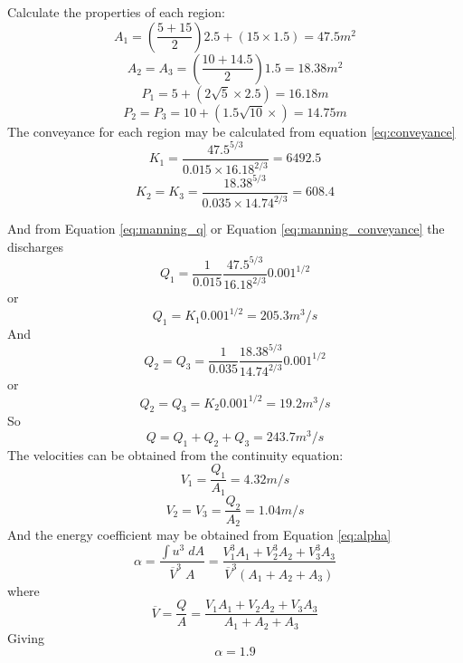 \documentclass[a4paper, 12pt, british]{article} %
\numberwithin{equation}{section}
\numberwithin{figure}{section}
\numberwithin{table}{section}
\begin{document}
Calculate the properties of each region:
\begin{equation*}
A_1 = \left( \frac{5+15}{2}\right)2.5+(15 \times 1.5) = 47.5m^2
\end{equation*}
\begin{equation*}
A_2 = A_3 = \left( \frac{10+14.5}{2}\right)1.5 = 18.38m^2
\end{equation*}
\begin{equation*}
P_1 = 5 + \left(2 \sqrt{5}\times 2.5\right) = 16.18m
\end{equation*}
\begin{equation*}
P_2 = P_3=10 + \left(1.5 \sqrt{10}\times \right) = 14.75m
\end{equation*}
The conveyance for each region may be calculated from equation \ref{eq:conveyance}
\begin{equation*}
K_1 =\frac{47.5^{5/3}}{0.015 \times 16.18^{2/3}} = 6492.5
\end{equation*}
\begin{equation*}
K_2 = K_3 =\frac{18.38^{5/3}}{0.035 \times 14.74^{2/3}} = 608.4
\end{equation*}


And from Equation \ref{eq:manning_q} or Equation \ref{eq:manning_conveyance}
the discharges
\begin{equation*}
Q_1 = \frac{1}{0.015}\frac{47.5^{5/3}}{16.18^{2/3}}0.001^{1/2}
\end{equation*}
or
\begin{equation*}
Q_1 = K_1 0.001^{1/2}= 205.3 m^3/s
\end{equation*}
And
\begin{equation*}
Q_2 = Q_3 = \frac{1}{0.035}\frac{18.38^{5/3}}{14.74^{2/3}}0.001^{1/2}
\end{equation*}
or
\begin{equation*}
Q_2=Q_3 = K_2 0.001^{1/2}= 19.2 m^3/s
\end{equation*}
So
\begin{equation*}
Q = Q_1 + Q_2 + Q_3 = 243.7 m^3/s
\end{equation*}
The velocities can be obtained from the continuity equation:
\begin{equation*}
V_1 = \frac{Q_1}{A_1} = 4.32 m/s
\end{equation*}
\begin{equation*}
V_2 = V_3 = \frac{Q_2}{A_2} = 1.04 m/s
\end{equation*}
And the energy coefficient may be obtained from Equation \ref{eq:alpha}
\begin{equation*}
\alpha = \frac{\int u^3 \; dA}{\overline{V}^3 \; A} = \frac{V_1^3 A_1+ V_2^3 A_2+V_3^3 A_3}{\overline{V}^3(A_1+A_2+A_3)} 
\end{equation*}
where
\begin{equation*}
\overline{V} = \frac{Q}{A} = \frac{V_1 A_1+ V_2 A_2+V_3 A_3}{A_1+A_2+A_3} 
\end{equation*} 
Giving 
\begin{equation*}
\alpha = 1.9
\end{equation*}
\end{document}
